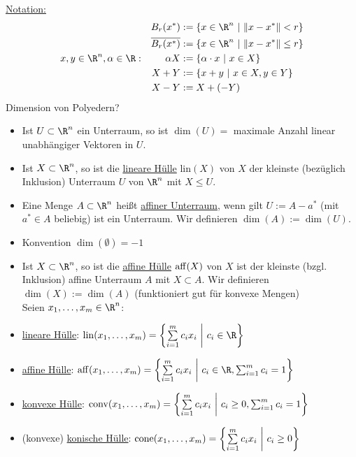 \underline{Notation:}
\begin{align*}
  && B_{r}(x^*) &:= \left\{ x \in \R^n \ | \ \|x - x^*\|<r \right\}\\
  && \overline{B_{r}(x^*)} &:= \left\{ x \in \R^n \ | \ \|x - x^*\|\leq r \right\} \\
  x,y \in \R^n, \alpha \in \R:&& \alpha X &:= \left\{ \alpha \cdot x \ |\ x \in X \right\}\\
                              && X + Y &:=\left\{ x + y  \ |\ x \in X, y \in Y \right\}\\
                              && X - Y &:= X + (-Y)
\end{align*}
Dimension von Polyedern?
\begin{itemize}
	\item Ist $U \subset  \R^n$ ein Unterraum, so ist $\dim(U)=$ maximale Anzahl linear unabhängiger Vektoren in $U$.
	\item Ist $X \subset \R^n$, so ist die \underline{lineare Hülle} lin$(X)$ von $X$ der kleinste (bezüglich Inklusion) Unterraum $U$ von $\R^n$ mit $X \leq U$.
	\item Eine Menge $A \subset  \R^n$ heißt \underline{affiner Unterraum}, wenn gilt $U:=A-a^*$ (mit $a^* \in A$ beliebig) ist ein Unterraum.
		Wir definieren $\dim(A) := \dim(U)$.
  \item Konvention $\dim(\emptyset)=-1$
  \item Ist $X\subset \R^n$, so ist die \underline{affine Hülle} $\operatorname{aff}(X)$ von $X$ ist der kleinste (bzgl. Inklusion) affine Unterraum $A$ mit $X\subset A$.
    Wir definieren $\dim(X):=\dim(A)$ (funktioniert gut für konvexe Mengen)\\
    Seien $x_{1},\dots ,x_{m}\in\R^n$:
	\item \underline{lineare Hülle}: $\lin(x_{1},\dots ,x_{m})= \left\{ \sum\limits_{i=1}^{m} c_{i}x_{i}\ \middle| \ c_{i}\in \R \right\}$
	\item \underline{affine Hülle}: $\aff(x_{1},\dots ,x_{m})= \left\{ \sum\limits_{i=1}^{m} c_{i}x_{i}\ \middle| \ c_{i}\in \R, \sum_{i=1}^{m} c_{i}= 1 \right\}$
	\item \underline{konvexe Hülle}: $\operatorname{conv}(x_{1},\dots ,x_{m})= \left\{ \sum\limits_{i=1}^{m} c_{i}x_{i}\ \middle| \ c_{i}\geq 0, \sum_{i=1}^{m} c_{i}= 1 \right\}$
	\item (konvexe) \underline{konische Hülle}: $\operatorname{cone}(x_{1},\dots ,x_{m})= \left\{ \sum\limits_{i=1}^{m} c_{i}x_{i}\ \middle| \ c_{i}\geq 0 \right\}$

\end{itemize}
